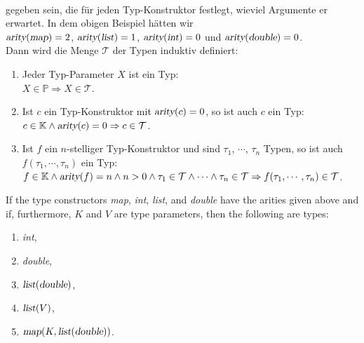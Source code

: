\\[0.2cm]
gegeben sein, die f\"ur jeden Typ-Konstruktor festlegt, wieviel Argumente er erwartet.
In dem obigen Beispiel h\"atten wir
\\[0.2cm]
\hspace*{1.3cm}
$\textsl{arity}(\textsl{map}) = 2$, \quad
$\textsl{arity}(\textsl{list}) = 1$, \quad
$\textsl{arity}(\textsl{int}) = 0$ \quad und \quad
$\textsl{arity}(\textsl{double}) = 0$.
\\[0.2cm]
Dann wird die Menge $\mathcal{T}$ der Typen induktiv definiert:
\begin{enumerate}
\item Jeder Typ-Parameter $X$ ist ein Typ:
      \\[0.2cm]
      \hspace*{1.3cm} $X \in \mathbb{P} \Rightarrow X \in \mathcal{T}$.
\item Ist $c$ ein Typ-Konstruktor mit $\textsl{arity}(c) = 0$, so ist auch $c$ ein Typ:
      \\[0.2cm]
      \hspace*{1.3cm}
      $c \in \mathbb{K} \wedge \textsl{arity}(c) = 0 \Rightarrow c \in \mathcal{T}$.
\item Ist $f$ ein $n$-stelliger Typ-Konstruktor und sind $\tau_1$, $\cdots$, $\tau_n$
      Typen, so ist auch $f(\tau_1,\cdots,\tau_n)$ ein Typ:
      \\[0.2cm]
      \hspace*{1.3cm}
      $f \in \mathbb{K} \wedge \textsl{arity}(f) = n \wedge n > 0 \wedge
       \tau_1 \in \mathcal{T} \wedge \cdots \wedge \tau_n \in \mathcal{T} \Rightarrow
       f(\tau_1, \cdots, \tau_n) \in \mathcal{T}$.
\end{enumerate}

\examplesEng
If the type constructors \textsl{map}, \textsl{int}, \textsl{list}, and \textsl{double}
have the arities given above and if, furthermore, $K$ and $V$ are type parameters, then
the following are types:
\begin{enumerate}
\item \textsl{int},
\item \textsl{double},
\item $\textsl{list}(\textsl{double})$, 
\item $\textsl{list}(V)$, 
\item $\textsl{map}(K,\textsl{list}(\textsl{double}))$.  \eox
\end{enumerate}  


